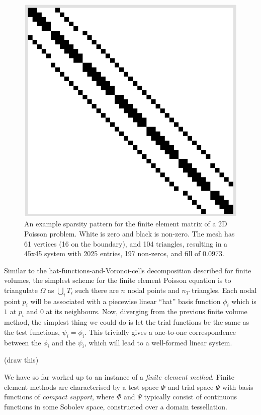 \begin{figure}[H]
    \begin{center}
        \includegraphics[width=0.26\linewidth]{figures/sparsity_pattern_no_text.png}
    \end{center}
    \caption{\scriptsize
        An example sparsity pattern for the finite element matrix of a 2D Poisson problem. White is zero and black is non-zero.
        The mesh has 61 vertices (16 on the boundary), and 104 triangles, resulting in a 45x45 system with 2025 entries, 197 non-zeros, and fill of $0.0973$.
    }
    \label{sparsity_pattern}
\end{figure}


Similar to the hat-functions-and-Voronoi-cells decomposition described for finite volumes,
the simplest scheme for the finite element Poisson equation is to triangulate $\Omega$ as
    $\bigcup_i T_i$
such there are $n$ nodal points and $n_T$ triangles.
Each nodal point $p_i$ will be associated with a piecewise linear ``hat'' basis function $\phi_i$ which is $1$ at $p_i$ and
$0$ at its neighbours. Now, diverging from the previous finite volume method, the simplest thing we could do is let the trial functions be the same
as the test functions, $\psi_i = \phi_i$. This trivially gives a one-to-one correspondence between the $\phi_i$ and the $\psi_i$, which will lead
to a well-formed linear system.

\vskip 0.1in
(draw this)
\vskip 0.1in


We have so far worked up to an instance of a \textit{finite element method}.
Finite element methods are characterised by a test space $\Phi$ and trial space
$\Psi$ with basis functions of \textit{compact support}, where $\Phi$ and $\Psi$ typically consist of continuous functions in
some Sobolev space, constructed over a domain tessellation.


